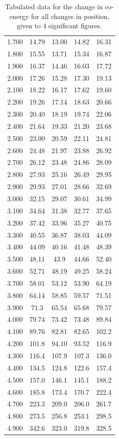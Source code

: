 \documentclass[a4paper]{IEEEtran}
\begin{document}
\begin{table}[]
\begin{tabular}{c|cccc}
1.700 & 14.79 & 13.00 & 14.82 & 16.31 \\
1.800 & 15.55 & 13.71 & 15.34 & 16.87 \\
1.900 & 16.37 & 14.46 & 16.03 & 17.72 \\
2.000 & 17.26 & 15.28 & 17.30 & 19.13 \\
2.100 & 18.22 & 16.17 & 17.62 & 19.60 \\
2.200 & 19.26 & 17.14 & 18.63 & 20.66 \\
2.300 & 20.40 & 18.19 & 19.74 & 22.06 \\
2.400 & 21.64 & 19.33 & 21.20 & 23.68 \\
2.500 & 23.00 & 20.59 & 22.11 & 24.81 \\
2.600 & 24.48 & 21.97 & 23.88 & 26.92 \\
2.700 & 26.12 & 23.48 & 24.86 & 28.09 \\
2.800 & 27.93 & 25.16 & 26.49 & 29.95 \\
2.900 & 29.93 & 27.01 & 28.66 & 32.69 \\
3.000 & 32.15 & 29.07 & 30.61 & 34.99 \\
3.100 & 34.64 & 31.38 & 32.77 & 37.65 \\
3.200 & 37.42 & 33.96 & 35.27 & 40.75 \\
3.300 & 40.55 & 36.87 & 38.03 & 44.09 \\
3.400 & 44.09 & 40.16 & 41.48 & 48.39 \\
3.500 & 48.11 & 43.9 & 44.66 & 52.40 \\
3.600 & 52.71 & 48.19 & 49.25 & 58.24 \\
3.700 & 58.01 & 53.12 & 53.90 & 64.19 \\
3.800 & 64.14 & 58.85 & 59.57 & 71.51 \\
3.900 & 71.3 & 65.54 & 65.68 & 79.57 \\
4.000 & 79.74 & 73.42 & 73.48 & 89.84 \\
4.100 & 89.76 & 82.81 & 82.65 & 102.2 \\
4.200 & 101.8 & 94.10 & 93.52 & 116.9 \\
4.300 & 116.4 & 107.9 & 107.3 & 136.0 \\
4.400 & 134.5 & 124.8 & 122.6 & 157.4 \\
4.500 & 157.0 & 146.1 & 145.1 & 188.2 \\
4.600 & 185.8 & 173.4 & 170.7 & 222.4 \\
4.700 & 223.3 & 209.0 & 206.0 & 261.7 \\
4.800 & 273.5 & 256.8 & 253.1 & 298.5 \\
4.900 & 342.6 & 323.0 & 319.8 & 328.5
\end{tabular}
\caption{Tabulated data for the change in co-energy for all changes in position, given to 4 significant figures.}
\label{coenergy}
\end{table}
\end{document}
